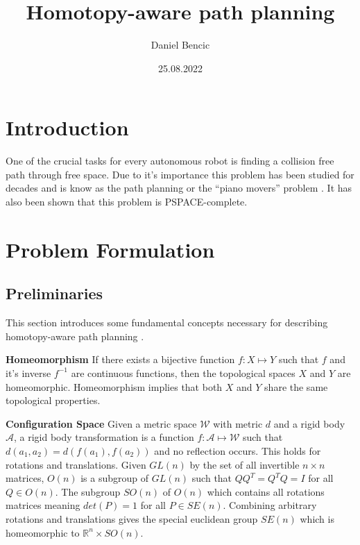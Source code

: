 \message{ !name(proposal.tex)}\documentclass[11pt,twocolumn]{article}
\title{Homotopy-aware path planning} \author{Daniel Bencic}
\date{25.08.2022}
\begin{document}

\maketitle

\section*{Introduction} One of the crucial tasks for every autonomous
robot is finding a collision free path through free space. Due to it's
importance this problem has been studied for decades and is know as
the path planning or the ``piano movers'' problem
\cite{schwartzPianoMoversProblem1983a,schwartzPianoMoversProblem1983b}. It
has also been shown \cite{reifComplexityMoverProblem1979} that this
problem is PSPACE-complete.

\section*{Problem Formulation}
\subsection*{Preliminaries} This section introduces some fundamental
concepts necessary for describing homotopy-aware path planning
\cite{munkresTopology2014,lavallePlanningAlgorithms2006,hatcherAlgebraicTopology2002}.

\textbf{Homeomorphism} If there exists a bijective function \(f: X
\mapsto Y\) such that \(f\) and it's inverse \(f^{-1}\) are continuous
functions, then the topological spaces \(X\) and \(Y\) are
homeomorphic. Homeomorphism implies that both \(X\) and \(Y\) share
the same topological properties.

\textbf{Configuration Space} Given a metric space \(\mathcal{W}\) with
metric \(d\) and a rigid body \(\mathcal{A}\), a rigid body
transformation is a function \(f: \mathcal{A} \mapsto \mathcal{W}\)
such that \(d(a_{1}, a_{2}) = d(f(a_{1}), f(a_{2}))\) and no
reflection occurs. This holds for rotations and translations. Given
\(GL(n)\) by the set of all invertible \(n \times n\) matrices,
\(O(n)\) is a subgroup of \(GL(n)\) such that \(QQ^{T} = Q^{T}Q = I\)
for all \(Q \in O(n)\). The subgroup \(SO(n)\) of \(O(n)\) which
contains all rotations matrices meaning \(det(P) = 1\) for all \(P \in
SE(n)\). Combining arbitrary rotations and translations gives the
special euclidean group \(SE(n)\) which is homeomorphic to
\(\mathbb{R}^{n} \times SO(n)\).
\end{document}

